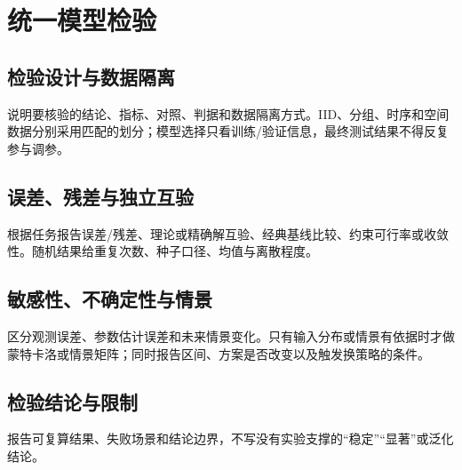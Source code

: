 \section{统一模型检验}

\subsection{检验设计与数据隔离}

说明要核验的结论、指标、对照、判据和数据隔离方式。IID、分组、时序和空间数据分别采用匹配的划分；模型选择只看训练/验证信息，最终测试结果不得反复参与调参。

\subsection{误差、残差与独立互验}

根据任务报告误差/残差、理论或精确解互验、经典基线比较、约束可行率或收敛性。随机结果给重复次数、种子口径、均值与离散程度。

\subsection{敏感性、不确定性与情景}

区分观测误差、参数估计误差和未来情景变化。只有输入分布或情景有依据时才做蒙特卡洛或情景矩阵；同时报告区间、方案是否改变以及触发换策略的条件。

\subsection{检验结论与限制}

报告可复算结果、失败场景和结论边界，不写没有实验支撑的“稳定”“显著”或泛化结论。
